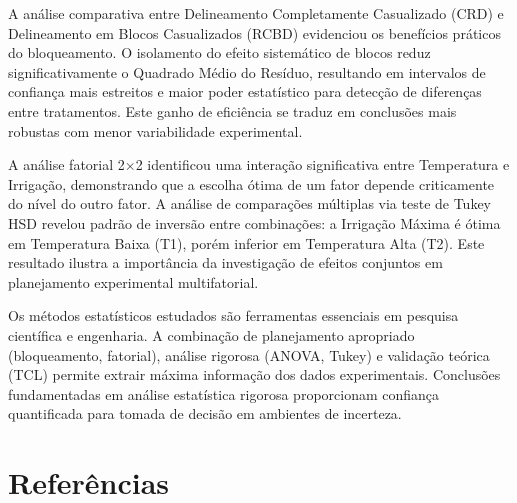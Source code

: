\documentclass[12pt,a4paper,oneside]{article}
\begin{document}
A análise comparativa entre Delineamento Completamente Casualizado (CRD) e Delineamento em Blocos Casualizados (RCBD) evidenciou os benefícios práticos do bloqueamento. O isolamento do efeito sistemático de blocos reduz significativamente o Quadrado Médio do Resíduo, resultando em intervalos de confiança mais estreitos e maior poder estatístico para detecção de diferenças entre tratamentos. Este ganho de eficiência se traduz em conclusões mais robustas com menor variabilidade experimental.

A análise fatorial 2×2 identificou uma interação significativa entre Temperatura e Irrigação, demonstrando que a escolha ótima de um fator depende criticamente do nível do outro fator. A análise de comparações múltiplas via teste de Tukey HSD revelou padrão de inversão entre combinações: a Irrigação Máxima é ótima em Temperatura Baixa (T1), porém inferior em Temperatura Alta (T2). Este resultado ilustra a importância da investigação de efeitos conjuntos em planejamento experimental multifatorial.

Os métodos estatísticos estudados são ferramentas essenciais em pesquisa científica e engenharia. A combinação de planejamento apropriado (bloqueamento, fatorial), análise rigorosa (ANOVA, Tukey) e validação teórica (TCL) permite extrair máxima informação dos dados experimentais. Conclusões fundamentadas em análise estatística rigorosa proporcionam confiança quantificada para tomada de decisão em ambientes de incerteza.

\newpage
\section*{Referências}



\end{document}
